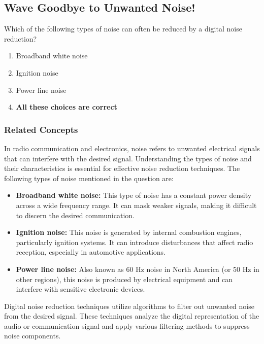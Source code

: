 \subsection{Wave Goodbye to Unwanted Noise!}

\begin{tcolorbox}[colback=gray!10, colframe=black, title=E4E02`]
Which of the following types of noise can often be reduced by a digital noise reduction? 
\begin{enumerate}[label=\Alph*.]
    \item Broadband white noise
    \item Ignition noise
    \item Power line noise
    \item \textbf{All these choices are correct}
\end{enumerate} \end{tcolorbox}

\subsubsection{Related Concepts}

In radio communication and electronics, noise refers to unwanted electrical signals that can interfere with the desired signal. Understanding the types of noise and their characteristics is essential for effective noise reduction techniques. The following types of noise mentioned in the question are:

\begin{itemize}
    \item \textbf{Broadband white noise:} This type of noise has a constant power density across a wide frequency range. It can mask weaker signals, making it difficult to discern the desired communication.
    
    \item \textbf{Ignition noise:} This noise is generated by internal combustion engines, particularly ignition systems. It can introduce disturbances that affect radio reception, especially in automotive applications.
    
    \item \textbf{Power line noise:} Also known as 60 Hz noise in North America (or 50 Hz in other regions), this noise is produced by electrical equipment and can interfere with sensitive electronic devices.
\end{itemize}

Digital noise reduction techniques utilize algorithms to filter out unwanted noise from the desired signal. These techniques analyze the digital representation of the audio or communication signal and apply various filtering methods to suppress noise components.

